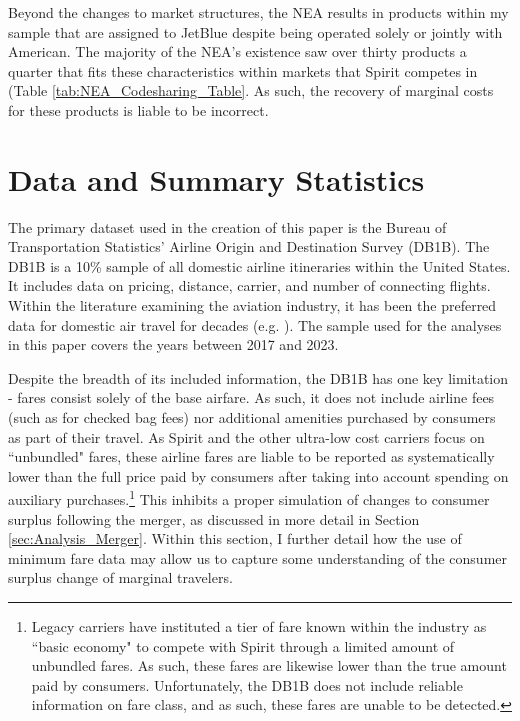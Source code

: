 \documentclass{article}
\begin{document}
    Beyond the changes to market structures, the NEA results in products within my sample that are assigned to JetBlue despite being operated solely or jointly with American. The majority of the NEA's existence saw over thirty products a quarter that fits these characteristics within markets that Spirit competes in (Table \ref{tab:NEA_Codesharing_Table}. As such, the recovery of marginal costs for these products is liable to be incorrect.  

	\section{Data and Summary Statistics}
	\label{sec:Data}
	The primary dataset used in the creation of this paper is the Bureau of Transportation Statistics' Airline Origin and Destination Survey (DB1B). The DB1B is a 10\% sample of all domestic airline itineraries within the United States. It includes data on pricing, distance, carrier, and number of connecting flights. Within the literature examining the aviation industry, it has been the preferred data for domestic air travel for decades (e.g. \citet{ciliberto_market_2021, berry_tracing_2010, goolsbee_how_2008, peters_evaluating_2006}). The sample used for the analyses in this paper covers the years between 2017 and 2023.  

    Despite the breadth of its included information, the DB1B has one key limitation - fares consist solely of the base airfare. As such, it does not include airline fees (such as for checked bag fees) nor additional amenities purchased by consumers as part of their travel. As Spirit and the other ultra-low cost carriers focus on ``unbundled" fares, these airline fares are liable to be reported as systematically lower than the full price paid by consumers after taking into account spending on auxiliary purchases.\footnote{Legacy carriers have instituted a tier of fare known within the industry as ``basic economy" to compete with Spirit through a limited amount of unbundled fares. As such, these fares are likewise lower than the true amount paid by consumers. Unfortunately, the DB1B does not include reliable information on fare class, and as such, these fares are unable to be detected.} This inhibits a proper simulation of changes to consumer surplus following the merger, as discussed in more detail in Section \ref{sec:Analysis_Merger}. Within this section, I further detail how the use of minimum fare data may allow us to capture some understanding of the consumer surplus change of marginal travelers.  
    	
\end{document}
